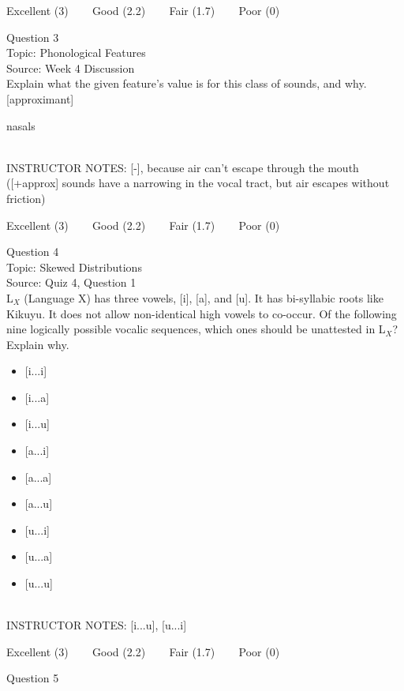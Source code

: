 \documentclass[12pt]{article}
\begin{document}
\vfill
Excellent (3) ~~~ Good (2.2) ~~~ Fair (1.7) ~~~ Poor (0)
\newpage

{\large Question 3}\\

Topic: Phonological Features\\
Source: Week 4 Discussion\\

Explain what the given feature’s value is for this class of sounds, and why.\\

{[approximant]}

nasals


~\\
INSTRUCTOR NOTES: [-], because air can't escape through the mouth ([+approx] sounds have a narrowing in the vocal tract, but air escapes without friction)


\vfill
Excellent (3) ~~~ Good (2.2) ~~~ Fair (1.7) ~~~ Poor (0)
\newpage

{\large Question 4}\\

Topic: Skewed Distributions\\
Source: Quiz 4, Question 1\\

L$_X$ (Language X) has three vowels, [i], [a], and [u]. It has bi-syllabic roots like Kikuyu. It does not allow non-identical high vowels to co-occur. Of the following nine logically possible vocalic sequences, which ones should be unattested in L$_X$? Explain why.\\

\begin{itemize} \item {[i...i]} \item {[i...a]} \item {[i...u]} \item {[a...i]} \item {[a...a]} \item {[a...u]} \item {[u...i]} \item {[u...a]} \item {[u...u]} \end{itemize}


~\\
INSTRUCTOR NOTES: [i...u], [u...i]


\vfill
Excellent (3) ~~~ Good (2.2) ~~~ Fair (1.7) ~~~ Poor (0)
\newpage

{\large Question 5}\\
\end{document}
